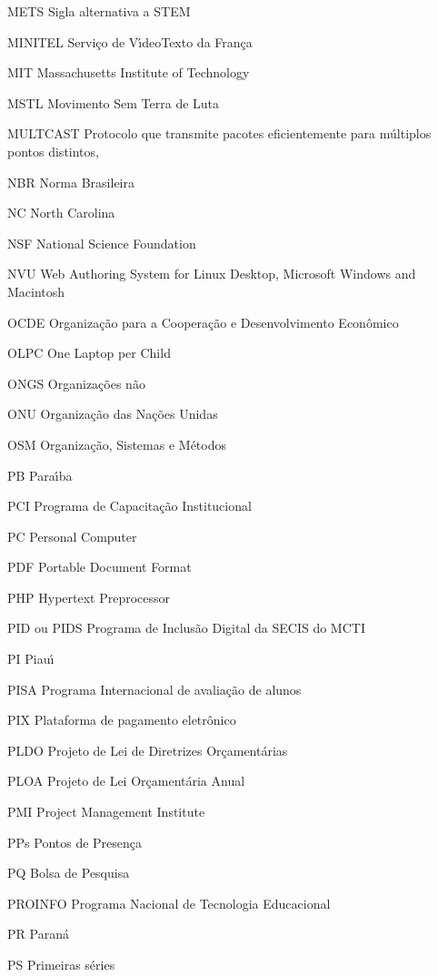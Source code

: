 \begin{siglas}
\item[METS] Sigla alternativa a STEM
\item[MINITEL] Servi\c{c}o de V\'{\i}deoTexto da Fran\c{c}a
\item[MIT] Massachusetts Institute of Technology
\item[MSTL]  Movimento Sem Terra de Luta
\item[MULTCAST] Protocolo que transmite pacotes eficientemente para m\'ultiplos pontos distintos,
\item[NBR] Norma Brasileira
\item[NC] North Carolina
\item[NSF] National Science Foundation
\item[NVU] Web Authoring System for Linux Desktop, Microsoft Windows and Macintosh
\item[OCDE] Organiza\c{c}\~ao para a Coopera\c{c}\~ao e Desenvolvimento Econ\^omico
\item[OLPC] One Laptop per Child 
\item[ONGS] Organiza\c{c}\~oes n\~ao
\item[ONU] Organiza\c{c}\~ao das Na\c{c}\~oes Unidas
\item[OSM] Organiza\c{c}\~ao, Sistemas e M\'etodos
\item[PB] Para\'{\i}ba
\item[PCI] Programa de Capacita\c{c}\~ao Institucional
\item[PC] Personal Computer
\item[PDF] Portable Document Format
\item[PHP] Hypertext Preprocessor
\item[PID ou PIDS] Programa de Inclus\~ao Digital da SECIS do MCTI
\item[PI] Piau\'{\i}
\item[PISA] Programa Internacional de avalia\c{c}\~ao de alunos
\item[PIX] Plataforma de pagamento eletr\^onico
\item[PLDO] Projeto de Lei de Diretrizes Or\c{c}ament\'arias
\item[PLOA] Projeto de Lei Or\c{c}ament\'aria Anual
\item[PMI] Project Management Institute
\item[PPs] Pontos de Presen\c{c}a 
\item[PQ] Bolsa de Pesquisa
\item[PROINFO] Programa Nacional de Tecnologia Educacional
\item[PR] Paran\'a
\item[PS] Primeiras s\'eries

\end{siglas}

